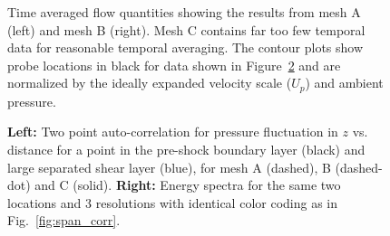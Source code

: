 \documentclass[]{aiaa-tc}%
\begin{document}



\begin{figure}
	\hspace{-.65in}
	
	\hspace{-.65in}
	
	\hspace{-.65in}
	\caption{ Time averaged flow quantities showing the results from mesh A (left) and mesh B (right).  Mesh C contains far too few temporal data for reasonable temporal averaging.  The contour plots show probe locations in black for data shown in Figure~\ref{fig:span} and are normalized by the ideally expanded velocity scale ($U_p$) and ambient pressure.
 	}
	\label{fig:mean}
\end{figure}


\begin{figure}[!ht]
	\centering
	\caption{ {\bf Left:} Two point auto-correlation for pressure fluctuation in $z$ vs. distance for a point in the pre-shock boundary layer (black) and large separated shear layer (blue), for mesh A (dashed), B (dashed-dot) and C (solid).  
	{\bf Right:} Energy spectra for the same two locations and 3 resolutions with identical color coding as in Fig.~\ref{fig:span_corr}.
 	}
	\label{fig:span}
\end{figure}
\end{document}
